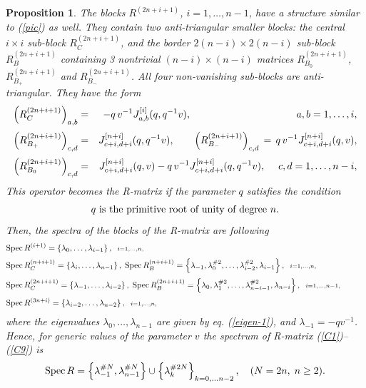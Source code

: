 \documentclass[11pt]{article}
\def\be{\begin{equation}}\def\ee{\end{equation}}
\def\ba{\begin{eqnarray}}\def\ea{\end{eqnarray}}
\newcounter{theorem}\def\thetheorem{\thesection.\arabic{theorem}}\makeatletter
\newtheorem{prop}[theorem]{Proposition}
\begin{document}
\begin{prop}
	The blocks  $R^{(2n+i+1)}$, $i=1,\dots ,n-1$, have a structure similar to (\ref{pic}) as well. They contain two anti-triangular smaller blocks:
	the central $i\times i$ sub-block $R_{C}^{(2n+i+1)}$, and the border $2(n-i)\times 2(n-i)$ sub-block $R_{B}^{(2n+i+1)}$ containing 3 nontrivial $(n-i)\times (n-i)$ matrices 
	$R_{B_0}^{(2n+i+1)}$, $R_{B_+}^{(2n+i+1)}$ and $R_{B_-}^{(2n+i+1)}$. All four non-vanishing sub-blocks are anti-triangular. They have the form
	\ba
	\lb{C7}
	\left(R_{C}^{(2n+i+1)}\right)_{a,b} &=& -q\,v^{-1} J^{[i]}_{a,b}(q,q^{-1} v), \qquad \qquad \qquad \qquad\qquad\;\; a,b=1,\dots , i,
	\\[2pt]
	\lb{C8}
	\left(R_{B_+}^{(2n+i+1)}\right)_{c,d} &=& J^{[n+i]}_{c+i,d+i}(q,q^{-1}v), \qquad
	\left(R_{B_-}^{(2n+i+1)}\right)_{c,d} \,=\, q\,v^{-1} J^{[n+i]}_{c+i,d+i}(q,v),
	\\[2pt]
	\lb{C9}
	\left(R_{B_0}^{(2n+i+1)}\right)_{c,d} &=&  J^{[n+i]}_{c+i,d+i}(q, v) - q\, v^{-1} J^{[n+i]}_{c+i,d+i}(q,q^{-1}v),\quad\;  c,d= 1,\dots , n-i,
	\ea
	This operator becomes the R-matrix if the parameter $q$  satisfies the condition	
	\be 
	\lb{restrict-C}
\mbox{\rm $q$ is the primitive root of unity of degree $n$.}
	\ee	
	Then, the spectra of the blocks of the R-matrix are following
	\ba
	\lb{specR-c1}
	&
	{\rm Spec\,} R^{(i+1)} = \left\{  \lambda_0,\dots ,\lambda_{i-1}  \right\}, \;\; {\scriptstyle i=1,\dots ,n,}
	&
	\\[2pt]
		\lb{specR-c2}
	&
	{\rm Spec\,} R_{C}^{(n+i+1)} = \left\{  \lambda_i,\dots ,
	\lambda_{n-1}   \right\},\; 
	{\rm Spec\,} R_{B}^{(n+i+1)} = \left\{  \lambda_{-1},\lambda_0^{\# 2},\dots ,   \lambda_{i-2}^{\# 2},\lambda_{i-1}\right\}, \;\; {\scriptstyle i=1,\dots ,n,}
	\\[2pt]
		\lb{specR-c3}
	&
	{\rm Spec\,} R_{C}^{(2n+i+1)} = \left\{  \lambda_{-1},\dots ,
	\lambda_{i-2}   \right\},\; 
	{\rm Spec\,} R_{B}^{(2n+i+1)} = \left\{  \lambda_0,\lambda_1^{\# 2},\dots ,   \lambda_{n-i-1}^{\# 2},\lambda_{n-i}\right\}, \;\; {\scriptstyle i=1,\dots ,n-1,}
	\qquad&
	\\[2pt]
		\lb{specR-c4}
	&
	{\rm Spec\,} R^{(3n+i)} = \left\{  \lambda_{i-2},\dots ,\lambda_{n-2}  \right\}, \;\; {\scriptstyle i=1,\dots ,n,}
	&
	\ea
	where the eigenvalues $\lambda_0, \dots, \lambda_{n-1}$ are given by eq. (\ref{eigen-1}), and $\lambda_{-1}=-q v^{-1}$. Hence, for generic values of the parameter $v$ the spectrum of R-matrix (\ref{C1})--(\ref{C9}) is
	\be 
	\lb{specR-C}
	{\rm Spec\,} R = \left\{ \lambda_{-1}^{\# N},\lambda_{n-1}^{\# N }\right\}\cup
	\left\{ \lambda_k^{\# 2N}   \right\}_{k=0,\dots n-2}, \quad (N=2n,\; n\geq 2).
	\ee
	\end{prop}
	
\end{document}
